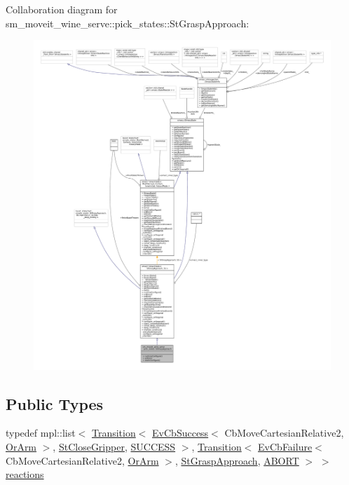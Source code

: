 Collaboration diagram for sm\+\_\+moveit\+\_\+wine\+\_\+serve\+:\+:pick\+\_\+states\+:\+:St\+Grasp\+Approach\+:
\nopagebreak
\begin{figure}[H]
\begin{center}
\leavevmode
\includegraphics[width=350pt]{structsm__moveit__wine__serve_1_1pick__states_1_1StGraspApproach__coll__graph}
\end{center}
\end{figure}
\subsection*{Public Types}
\begin{DoxyCompactItemize}
\item 
typedef mpl\+::list$<$ \hyperlink{classsmacc_1_1Transition}{Transition}$<$ \hyperlink{structsmacc_1_1EvCbSuccess}{Ev\+Cb\+Success}$<$ Cb\+Move\+Cartesian\+Relative2, \hyperlink{classsm__moveit__wine__serve_1_1OrArm}{Or\+Arm} $>$, \hyperlink{structsm__moveit__wine__serve_1_1pick__states_1_1StCloseGripper}{St\+Close\+Gripper}, \hyperlink{structsmacc_1_1default__transition__tags_1_1SUCCESS}{S\+U\+C\+C\+E\+SS} $>$, \hyperlink{classsmacc_1_1Transition}{Transition}$<$ \hyperlink{structsmacc_1_1EvCbFailure}{Ev\+Cb\+Failure}$<$ Cb\+Move\+Cartesian\+Relative2, \hyperlink{classsm__moveit__wine__serve_1_1OrArm}{Or\+Arm} $>$, \hyperlink{structsm__moveit__wine__serve_1_1pick__states_1_1StGraspApproach}{St\+Grasp\+Approach}, \hyperlink{structsmacc_1_1default__transition__tags_1_1ABORT}{A\+B\+O\+RT} $>$ $>$ \hyperlink{structsm__moveit__wine__serve_1_1pick__states_1_1StGraspApproach_ac442fb60d47913f7c15d192661053714}{reactions}
\end{DoxyCompactItemize}
